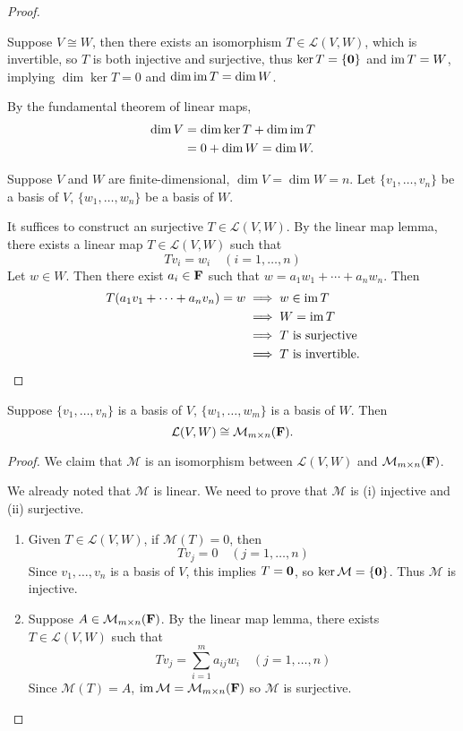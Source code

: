 \begin{proof} \

\fbox{$\implies$} Suppose $V\cong W$, then there exists an isomorphism $T\in\mathcal{L}(V,W)$, which is invertible, so $T$ is both injective and surjective, thus $\ker T=\{\vb{0}\}$ and $\operatorname{im} T=W$, implying $\dim\ker T=0$ and $\dim\operatorname{im} T=\dim W$.

By the fundamental theorem of linear maps,
\begin{align*}
\dim V&=\dim\ker T+\dim\operatorname{im} T\\
&=0+\dim W=\dim W.
\end{align*}

\fbox{$\impliedby$} Suppose $V$ and $W$ are finite-dimensional, $\dim V=\dim W=n$. Let $\{v_1,\dots,v_n\}$ be a basis of $V$, $\{w_1,\dots,w_n\}$ be a basis of $W$. 

It suffices to construct an surjective $T\in\mathcal{L}(V,W)$. By the linear map lemma, there exists a linear map $T\in\mathcal{L}(V,W)$ such that
\[Tv_i=w_i\quad(i=1,\dots,n)\]
Let $w\in W$. Then there exist $a_i\in\mathbf F$ such that $w=a_1w_1+\cdots+a_nw_n$. Then
\begin{align*}
T(a_1v_1+\cdots+a_nv_n)=w&\implies w\in\operatorname{im} T\\
&\implies W=\operatorname{im} T\\
&\implies T\text{ is surjective}\\
&\implies T\text{ is invertible.}
\end{align*}
\end{proof}

\begin{proposition}
Suppose $\{v_1,\dots,v_n\}$ is a basis of $V$, $\{w_1,\dots,w_m\}$ is a basis of $W$. Then
\[\mathcal{L}(V,W)\cong\mathcal{M}_{m\times n}(\mathbf F).\]
\end{proposition}

\begin{proof}
We claim that $\mathcal{M}$ is an isomorphism between $\mathcal{L}(V,W)$ and $\mathcal{M}_{m\times n}(\mathbf F)$.

We already noted that $\mathcal{M}$ is linear. We need to prove that $\mathcal{M}$ is (i) injective and (ii) surjective.
\begin{enumerate}[label=(\roman*)]
\item Given $T\in\mathcal{L}(V,W)$, if $\mathcal{M}(T)=0$, then
\[Tv_j=0\quad(j=1,\dots,n)\]
Since $v_1,\dots,v_n$ is a basis of $V$, this implies $T=\vb{0}$, so $\ker\mathcal{M}=\{\vb{0}\}$. Thus $\mathcal{M}$ is injective.

\item Suppose $A\in\mathcal{M}_{m\times n}(\mathbf F)$. By the linear map lemma, there exists $T\in\mathcal{L}(V,W)$ such that
\[Tv_j=\sum_{i=1}^{m}a_{ij}w_i\quad(j=1,\dots,n)\]
Since $\mathcal{M}(T)=A$, $\operatorname{im}\mathcal{M}=\mathcal{M}_{m\times n}(\mathbf F)$ so $\mathcal{M}$ is surjective.
\end{enumerate}
\end{proof}

